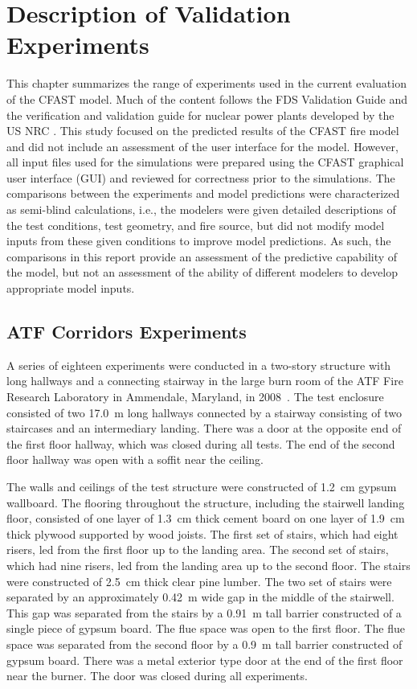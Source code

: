 \chapter{Description of Validation Experiments}

\label{Experiment_Chapter}

This chapter summarizes the range of experiments used in the current evaluation of the CFAST model. Much of the content follows the FDS Validation Guide \cite{FDS_Validation_Guide_6} and the verification and validation guide for nuclear power plants developed by the US NRC \cite{NRCNUREG1824}. This study focused on the predicted results of the CFAST fire model and did not include an assessment of the user interface for the model.  However, all input files used for the simulations were prepared using the CFAST graphical user interface (GUI) and reviewed for correctness prior to the simulations.  The comparisons between the experiments and model predictions were characterized as semi-blind calculations, i.e., the modelers were given detailed descriptions of the test conditions, test geometry, and fire source, but did not modify model inputs from these given conditions to improve model predictions.  As such, the comparisons in this report provide an assessment of the predictive capability of the model, but not an assessment of the ability of different modelers to develop appropriate model inputs.

\section{ATF Corridors Experiments}

A series of eighteen experiments were conducted in a two-story structure with long hallways and a connecting stairway
in the large burn room of the ATF Fire Research Laboratory in Ammendale, Maryland, in 2008~\cite{Sheppard:Corridors}.
The test enclosure consisted of two 17.0~m long hallways connected by a
stairway consisting of two staircases and an intermediary landing.
There was a door at the opposite end of the first floor hallway, which was closed during all tests.
The end of the second floor hallway was open with a soffit near the ceiling.

The walls and ceilings of the test structure were constructed of 1.2~cm gypsum wallboard.
The flooring throughout the structure, including the stairwell landing floor, consisted of one layer of 1.3~cm thick cement board on one
layer of 1.9~cm thick plywood supported by wood joists. The first set of stairs, which had eight risers, led from the first floor up to the landing area.
The second set of stairs, which had nine risers, led from the landing area up to the second floor.
The stairs were constructed of 2.5~cm thick clear pine lumber. The two set of stairs were separated by an approximately 0.42~m wide gap in the middle of the stairwell.
This gap was separated from the stairs by a 0.91~m tall barrier constructed of a single piece of gypsum board.
The flue space was open to the first floor.  The flue space was separated from the second floor by a 0.9~m tall barrier constructed of gypsum board.
There was a metal exterior type door at the end of the first floor near the burner.  The door was closed during all experiments.

